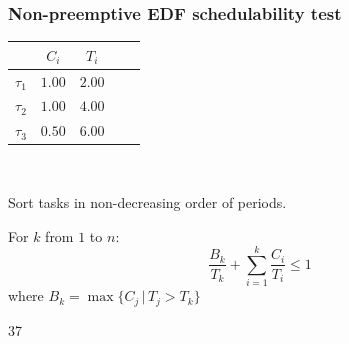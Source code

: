 \documentclass[svgnames,unknownkeysallowed]{beamer}
\begin{document}
\begin{frame}
\frametitle{Non-preemptive EDF schedulability test}


\vspace*{-0.1cm}


\begin{minipage}{0.20\textwidth} 	                        
	\begin{center}
		{\small
			\begin{tabular}{l|cccc}
				& $C_i$     & $T_i$  \\ \hline
				$\tau_1$ & $1.00$ & $2.00$   \\
					$\tau_2$ & $1.00$ & $4.00$ \\
					$\tau_3$ & $0.50$ & $6.00$ 
			\end{tabular}
		}
	\end{center}
\end{minipage}          
\begin{minipage}{0.1\textwidth}              
	$ $             
\end{minipage}
\begin{minipage}{0.65\textwidth}        
	{       \small
		 Sort tasks in non-decreasing order of  periods.
		
		For $k$ from $1$ to $n$:
		\vspace*{-0.3cm}
		\begin{equation*}
			\frac{B_k}{T_k} + \sum_{i=1}^k \frac{C_i}{T_i} \leq 1
		\end{equation*}
		\hspace*{1.3cm}	where $B_k = \max \{ C_j \, | \, T_j > T_k\}$  
	}
\end{minipage}
	


\begin{RTGrid}[width=.9\textwidth, height=3.8cm, nogrid=1, nonumbers=1,nosymbols=1]{3}{7}


	

\end{RTGrid}
\end{frame}
\end{document}
